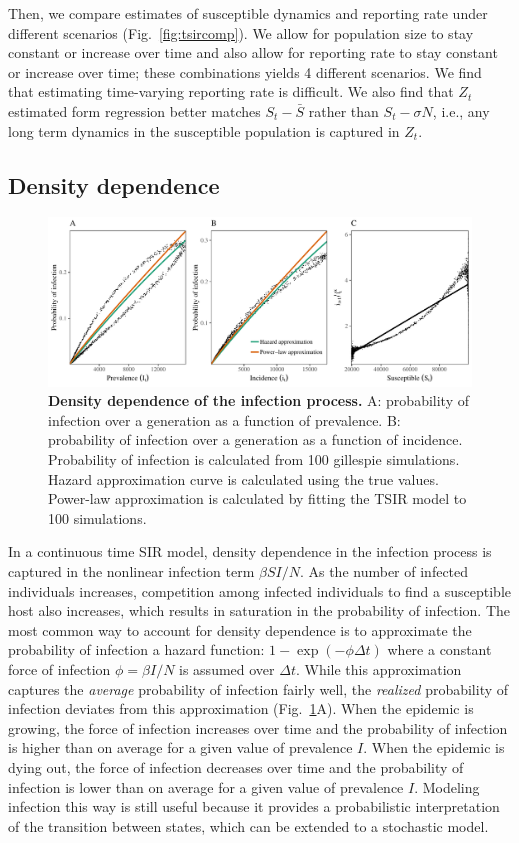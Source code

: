 \documentclass{article}
\newcommand{\fref}[1]{Fig.~\ref{fig:#1}}
\begin{document}
Then, we compare estimates of susceptible dynamics and reporting rate under different scenarios (\fref{tsircomp}).
We allow for population size to stay constant or increase over time and also allow for reporting rate to stay constant or increase over time; these combinations yields 4 different scenarios.
We find that estimating time-varying reporting rate is difficult.
We also find that $Z_t$ estimated form regression better matches $S_t - \bar{S}$ rather than $S_t - \sigma N$, i.e., any long term dynamics in the susceptible population is captured in $Z_t$.

\subsection{Density dependence}

\begin{figure}
\includegraphics[width=\textwidth]{../figure/tsir_poi.pdf}
\caption{
\textbf{Density dependence of the infection process.}
A: probability of infection over a generation as a function of prevalence.
B: probability of infection over a generation as a function of incidence.
Probability of infection is calculated from 100 gillespie simulations.
Hazard approximation curve is calculated using the true values.
Power-law approximation is calculated by fitting the TSIR model to 100 simulations.
}
\label{fig:tsirpoi}
\end{figure}

In a continuous time SIR model, density dependence in the infection process is captured in the nonlinear infection term $\beta S I/N$.
As the number of infected individuals increases, competition among infected individuals to find a susceptible host also increases, which results in saturation in the probability of infection.
The most common way to account for density dependence is to approximate the probability of infection a hazard function: $1- \exp(- \phi \Delta t)$ where a constant force of infection $\phi = \beta I/N$ is assumed over $\Delta t$.
While this approximation captures the \emph{average} probability of infection fairly well, the \emph{realized} probability of infection deviates from this approximation (\fref{tsirpoi}A).
When the epidemic is growing, the force of infection increases over time and the probability of infection is higher than on average for a given value of prevalence $I$.
When the epidemic is dying out, the force of infection decreases over time and the probability of infection is lower than on average for a given value of prevalence $I$.
Modeling infection this way is still useful because it provides a probabilistic interpretation of the transition between states, which can be extended to a stochastic model. 
\end{document}
